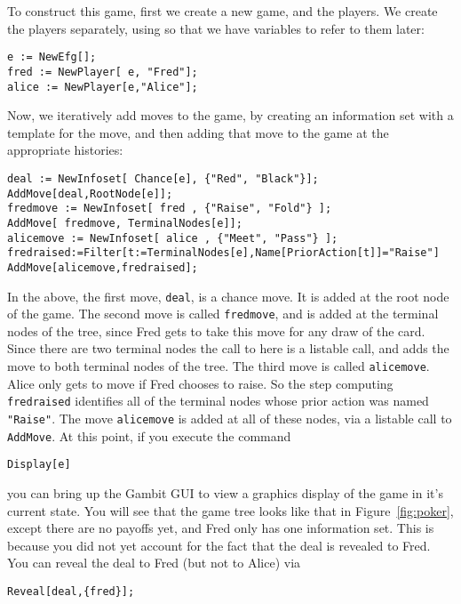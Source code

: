 To construct this game, first we create a new game, and the players.
We create the players separately, using  so that we
have variables to refer to them later:

\begin{verbatim}
e := NewEfg[];
fred := NewPlayer[ e, "Fred"];
alice := NewPlayer[e,"Alice"];
\end{verbatim}

Now, we iteratively add moves to the game, by creating an information
set with a template for the move, and then adding that move to the
game at the appropriate histories: 

\begin{verbatim}
deal := NewInfoset[ Chance[e], {"Red", "Black"}];
AddMove[deal,RootNode[e]];
fredmove := NewInfoset[ fred , {"Raise", "Fold"} ];
AddMove[ fredmove, TerminalNodes[e]];
alicemove := NewInfoset[ alice , {"Meet", "Pass"} ];
fredraised:=Filter[t:=TerminalNodes[e],Name[PriorAction[t]]="Raise"]
AddMove[alicemove,fredraised];
\end{verbatim}

In the above, the first move, \verb+deal+, is a chance move. It is
added at the root node of the game.  The second move is called
\verb+fredmove+, and is added at the terminal nodes of the tree, since
Fred gets to take this move for any draw of the card.  Since there are
two terminal nodes the call to   here is a listable call,
and adds the move to both terminal nodes of the tree.  The third move
is called \verb+alicemove+.  Alice only gets to move if Fred chooses
to raise.  So the step computing \verb+fredraised+ identifies all of
the terminal nodes whose prior action was named \verb+"Raise"+.  The
move \verb+alicemove+ is added at all of these nodes, via a listable
call to \verb+AddMove+.  At this point, if you execute the command

\begin{verbatim}
Display[e]
\end{verbatim}

\noindent
you can bring up the Gambit GUI to view a graphics display of the game
in it's current state. You will see that the game tree looks like that
in Figure~\ref{fig:poker}, except there are no payoffs yet, and Fred
only has one information set.  This is because you did not yet account
for the fact that the deal is revealed to Fred.  You can reveal the
deal to Fred (but not to Alice) via

\begin{verbatim}
Reveal[deal,{fred}];
\end{verbatim}

